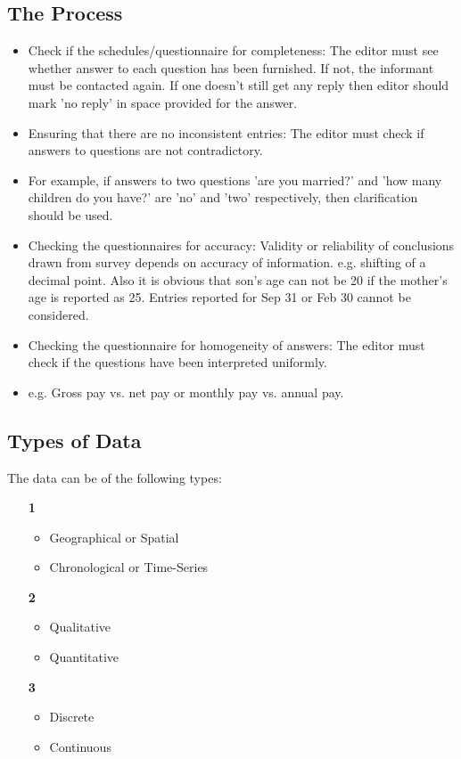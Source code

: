 \documentclass[
10pt, %
a4paper, %
]{report}
\begin{document}
\subsection*{The Process}
\begin{itemize}
\item Check if the schedules/questionnaire for completeness:
The editor must see whether answer to each question has been furnished. If not, the informant must be contacted again. If one doesn't still get any reply then editor should mark 'no reply' in space provided for the answer.
\item Ensuring that there are no inconsistent entries:
The editor must check if answers to questions are not contradictory.
\item For example, if answers to two questions 'are you married?' and 'how many children do you have?' are 'no' and 'two' respectively, then clarification should be used.
\item Checking the questionnaires for accuracy:
Validity or reliability of conclusions drawn from survey depends on
accuracy of information. e.g. shifting of a decimal point. Also it is obvious that son’s age can not be 20 if the mother’s age is reported as 25. Entries reported for Sep 31 or Feb 30 cannot be considered.
\item Checking the questionnaire for homogeneity of answers: The editor must check if the questions have been interpreted uniformly. \item e.g. Gross pay vs. net pay or monthly pay vs. annual pay.
\end{itemize}


\subsection*{Types of Data}
The data can be of the following types:
\begin{itemize}
\item[\textbf{1}]
\begin{itemize}
\item Geographical or Spatial
\item Chronological or Time-Series
\end{itemize}
\item[\textbf{2}]
\begin{itemize}
\item Qualitative
\item Quantitative
\end{itemize}
\item[\textbf{3}]
\begin{itemize}
\item Discrete
\item Continuous
\end{itemize}
\end{itemize}
\end{document}
